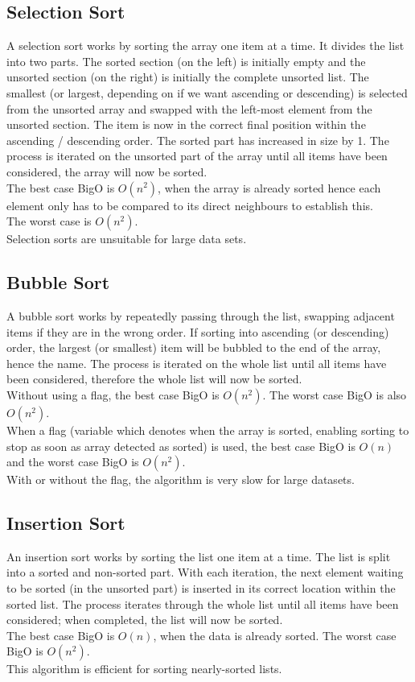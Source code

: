 \subsection{Selection Sort}
A selection sort works by sorting the array one item at a time. It divides the list into two parts. The sorted section (on the left) is initially empty and the unsorted section (on the right) is initially the complete unsorted list. The smallest (or largest, depending on if we want ascending or descending) is selected from the unsorted array and swapped with the left-most element from the unsorted section. The item is now in the correct final position within the ascending / descending order. The sorted part has increased in size by 1. The process is iterated on the unsorted part of the array until all items have been considered, the array will now be sorted.\\

The best case BigO is $O(n^2)$, when the array is already sorted hence each element only has to be compared to its direct neighbours to establish this.\\

The worst case is $O(n^2)$.\\

Selection sorts are unsuitable for large data sets.

\subsection{Bubble Sort}
A bubble sort works by repeatedly passing through the list, swapping adjacent items if they are in the wrong order. If sorting into ascending (or descending) order, the largest (or smallest) item will be bubbled to the end of the array, hence the name. The process is iterated on the whole list until all items have been considered, therefore the whole list will now be sorted.\\

Without using a flag, the best case BigO is $O(n^2)$. The worst case BigO is also $O(n^2)$.\\

When a flag (variable which denotes when the array is sorted, enabling sorting to stop as soon as array detected as sorted) is used, the best case BigO is $O(n)$ and the worst case BigO is $O(n^2)$.\\

With or without the flag, the algorithm is very slow for large datasets.

\subsection{Insertion Sort}
An insertion sort works by sorting the list one item at a time. The list is split into a sorted and non-sorted part. With each iteration, the next element waiting to be sorted (in the unsorted part) is inserted in its correct location within the sorted list. The process iterates through the whole list until all items have been considered; when completed, the list will now be sorted.\\

The best case BigO is $O(n)$, when the data is already sorted. The worst case BigO is $O(n^2)$.\\

This algorithm is efficient for sorting nearly-sorted lists. 